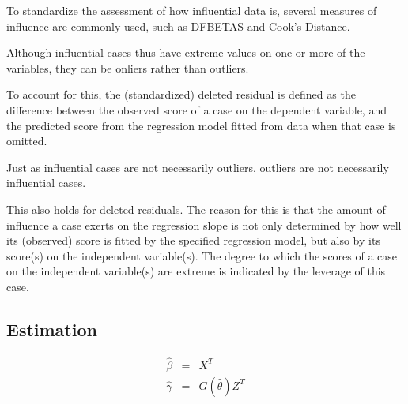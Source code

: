 \documentclass[12pt, a4paper]{report}
\theoremstyle{plain}
\theoremstyle{definition}
\theoremstyle{remark}
\begin{document}
To standardize the assessment of how influential data is, several measures of influence are commonly used, such as DFBETAS 
and Cook’s Distance.





Although influential cases thus have extreme values on one or more of the variables, they can be onliers
rather than outliers. 

To account for this, the (standardized) deleted residual is defined as the difference between
the observed score of a case on the dependent variable, and the predicted score from the regression
model fitted from data when that case is omitted.


Just as influential cases are not necessarily outliers, outliers are not necessarily influential cases. 

This also holds for deleted residuals. The reason for this is that the amount of influence a case exerts on the regression slope is not only determined by how well its (observed) score is fitted by the specified
regression model, but also by its score(s) on the independent variable(s). The degree to which the scores of a case on the independent variable(s) are extreme is indicated by the leverage of this case. 









\newpage

%
\subsection{Estimation}

\begin{eqnarray}
\hat{\beta} &=& X^{T} \\
\hat{\gamma} &=& G(\hat{\theta})Z^{T}
\end{eqnarray}
\end{document}

